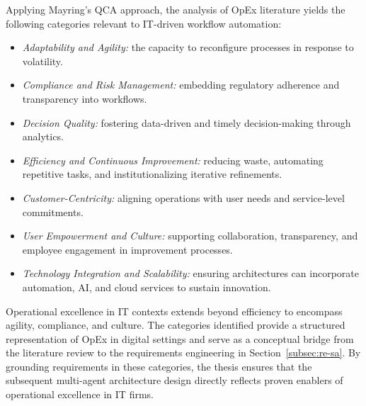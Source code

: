 Applying Mayring's QCA approach, the analysis of OpEx literature yields the following categories relevant to IT-driven workflow automation:
\begin{itemize}
    \item \emph{Adaptability and Agility:} the capacity to reconfigure processes in response to volatility.
    \item \emph{Compliance and Risk Management:} embedding regulatory adherence and transparency into workflows.
    \item \emph{Decision Quality:} fostering data-driven and timely decision-making through analytics.
    \item \emph{Efficiency and Continuous Improvement:} reducing waste, automating repetitive tasks, and institutionalizing iterative refinements.
    \item \emph{Customer-Centricity:} aligning operations with user needs and service-level commitments.
    \item \emph{User Empowerment and Culture:} supporting collaboration, transparency, and employee engagement in improvement processes.
    \item \emph{Technology Integration and Scalability:} ensuring architectures can incorporate automation, AI, and cloud services to sustain innovation.
\end{itemize}

Operational excellence in IT contexts extends beyond efficiency to encompass agility, compliance, and culture. The categories identified provide a structured representation of OpEx in digital settings and serve as a conceptual bridge from the literature review to the requirements engineering in Section~\ref{subsec:re-sa}. By grounding requirements in these categories, the thesis ensures that the subsequent multi-agent architecture design directly reflects proven enablers of operational excellence in IT firms.

